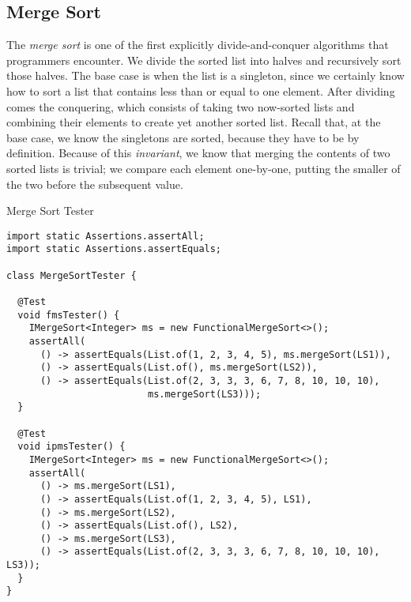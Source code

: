 \subsection*{Merge Sort}

The \textit{merge sort} is one of the first explicitly divide-and-conquer algorithms that programmers encounter. We divide the sorted list into halves and recursively sort those halves. The base case is when the list is a singleton, since we certainly know how to sort a list that contains less than or equal to one element. After dividing comes the conquering, which consists of taking two now-sorted lists and combining their elements to create yet another sorted list. Recall that, at the base case, we know the singletons are sorted, because they have to be by definition. Because of this \textit{invariant}, we know that merging the contents of two sorted lists is trivial; we compare each element one-by-one, putting the smaller of the two before the subsequent value.


\begin{cl}[]{Merge Sort Tester}
\begin{lstlisting}[language=MyJava]
import static Assertions.assertAll;
import static Assertions.assertEquals;

class MergeSortTester {

  @Test
  void fmsTester() {
    IMergeSort<Integer> ms = new FunctionalMergeSort<>();
    assertAll(
      () -> assertEquals(List.of(1, 2, 3, 4, 5), ms.mergeSort(LS1)),
      () -> assertEquals(List.of(), ms.mergeSort(LS2)),
      () -> assertEquals(List.of(2, 3, 3, 3, 6, 7, 8, 10, 10, 10), 
                         ms.mergeSort(LS3)));
  }

  @Test
  void ipmsTester() {
    IMergeSort<Integer> ms = new FunctionalMergeSort<>();
    assertAll(
      () -> ms.mergeSort(LS1),
      () -> assertEquals(List.of(1, 2, 3, 4, 5), LS1),
      () -> ms.mergeSort(LS2),
      () -> assertEquals(List.of(), LS2),
      () -> ms.mergeSort(LS3),
      () -> assertEquals(List.of(2, 3, 3, 3, 6, 7, 8, 10, 10, 10), LS3));
  }
}
\end{lstlisting}
\end{cl}
  
